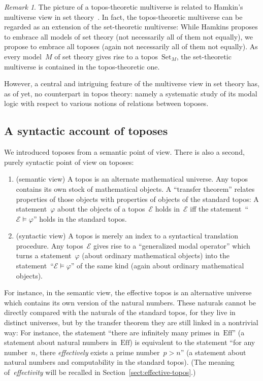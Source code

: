 \documentclass[oneside,reqno]{amsart}
\theoremstyle{definition}
\theoremstyle{plain}
\theoremstyle{remark}
\newtheorem{rem}[defn]{Remark}
\newcommand{\E}{\mathcal{E}}
\newcommand{\Set}{\mathrm{Set}}
\newcommand{\Eff}{\mathrm{Ef{}f}}
\renewcommand{\_}{\mathpunct{.}\,}
\newcommand{\effective}{ef{}fective\xspace}
\newcommand{\effectively}{ef{}fectively\xspace}
\newcommand{\?}{\,{:}\,}
\begin{document}
\begin{rem}The picture of a topos-theoretic multiverse is related to Hamkin's
multiverse view in set theory~\cite{hamkins:multiverse}. In fact, the
topos-theoretic multiverse can be regarded as an extension of the set-theoretic
multiverse: While Hamkins proposes to embrace all models of set theory (not
necessarily all of them not equally), we propose to embrace all toposes (again
not necessarily all of them not equally). As every model~$M$ of set theory
gives rise to a topos~$\Set_M$, the set-theoretic multiverse is contained in the
topos-theoretic one.

However, a central and intriguing feature of the multiverse view in set theory
has, as of yet, no counterpart in topos theory: namely a systematic study of
its modal logic with respect to various notions of relations between toposes.\end{rem}


\subsection{A syntactic account of toposes} We introduced toposes from a semantic
point of view. There is also a second, purely syntactic point of view on
toposes:
\begin{enumerate}
\item (semantic view) A topos is an alternate mathematical universe. Any topos
contains its own stock of mathematical objects. A ``transfer theorem'' relates
properties of those objects with properties of objects of the standard topos: A
statement~$\varphi$ about the objects of a topos~$\E$ holds in~$\E$ iff the
statement~``$\E \models \varphi$'' holds in the standard topos.
\item (syntactic view) A topos is merely an index to a syntactical translation
procedure. Any topos~$\E$ gives rise to a ``generalized modal operator'' which
turns a statement~$\varphi$ (about ordinary mathematical objects) into the
statement~``$\E \models \varphi$'' of the same kind (again about ordinary
mathematical objects).
\end{enumerate}

For instance, in the semantic view, the \effective topos is an alternative
universe which contains its own version of the natural numbers. These naturals
cannot be directly compared with the naturals of the standard topos, for they
live in distinct universes, but by the transfer theorem they are still linked in a
nontrivial way: For instance, the statement ``there are infinitely many primes
in~$\Eff$'' (a statement about natural numbers in~$\Eff$) is equivalent to the statement
``for any number~$n$, there \emph{\effectively} exists a prime number~$p > n$''
(a statement about natural numbers and computability in the standard topos).
(The meaning of~\emph{effectivity} will be recalled in
Section~\ref{sect:effective-topos}.)
\end{document}
